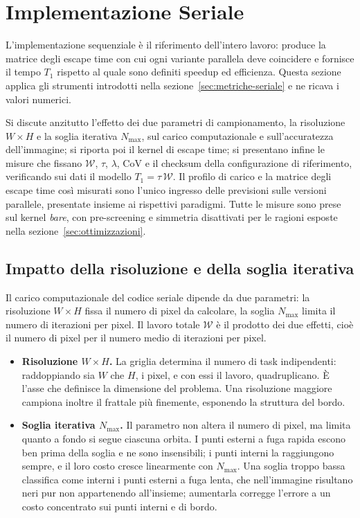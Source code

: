\section{Implementazione Seriale}
\label{sec:implementazione-seriale}

L'implementazione sequenziale è il riferimento dell'intero lavoro: produce la
matrice degli escape time con cui ogni variante parallela deve coincidere e
fornisce il tempo $T_1$ rispetto al quale sono definiti speedup ed efficienza.
Questa sezione applica gli strumenti introdotti nella
sezione~\ref{sec:metriche-seriale} e ne ricava i valori numerici.

Si discute anzitutto l'effetto dei due parametri di campionamento, la
risoluzione $W \times H$ e la soglia iterativa $N_{\max}$, sul carico
computazionale e sull'accuratezza dell'immagine; si riporta poi il kernel di
escape time; si presentano infine le misure che fissano $\mathcal{W}$, $\tau$,
$\lambda$, $\mathrm{CoV}$ e il checksum della configurazione di riferimento,
verificando sui dati il modello $T_1 = \tau\,\mathcal{W}$. Il profilo di carico
e la matrice degli escape time così misurati sono l'unico ingresso delle
previsioni sulle versioni parallele, presentate insieme ai rispettivi paradigmi.
Tutte le misure sono prese sul kernel \emph{bare}, con pre-screening e simmetria
disattivati per le ragioni esposte nella sezione~\ref{sec:ottimizzazioni}.

\subsection{Impatto della risoluzione e della soglia iterativa}
\label{sec:parametri}
Il carico computazionale del codice seriale dipende da due parametri: la
risoluzione $W \times H$ fissa il numero di pixel da calcolare, la soglia
$N_{\max}$ limita il numero di iterazioni per pixel. Il lavoro totale
$\mathcal{W}$ è il prodotto dei due effetti, cioè il numero di pixel per il
numero medio di iterazioni per pixel.

\begin{itemize}
  \item \textbf{Risoluzione $W \times H$.} La griglia determina il numero di task
  indipendenti: raddoppiando sia $W$ che $H$, i pixel, e con essi il lavoro,
  quadruplicano. È l'asse che definisce la dimensione del problema. Una
  risoluzione maggiore campiona inoltre il frattale più finemente, esponendo la
  struttura del bordo.

  \item \textbf{Soglia iterativa $N_{\max}$.} Il parametro non altera il numero
  di pixel, ma limita quanto a fondo si segue ciascuna orbita. I punti esterni a
  fuga rapida escono ben prima della soglia e ne sono insensibili; i punti
  interni la raggiungono sempre, e il loro costo cresce linearmente con
  $N_{\max}$. Una soglia troppo bassa classifica come interni i punti esterni a
  fuga lenta, che nell'immagine risultano neri pur non appartenendo all'insieme;
  aumentarla corregge l'errore a un costo concentrato sui punti interni e di
  bordo.
\end{itemize}

